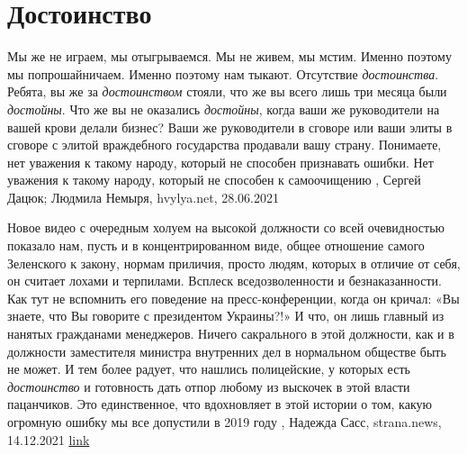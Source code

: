  
 
 
 
 
\chapter{Достоинство}
\label{sec:slova.dostoinstvo}

Мы же не играем, мы отыгрываемся. Мы не живем, мы мстим. Именно поэтому мы
попрошайничаем. Именно поэтому нам тыкают. Отсутствие \emph{достоинства}. Ребята, вы
же за \emph{достоинством} стояли, что же вы всего лишь три месяца были \emph{достойны}. Что
же вы не оказались \emph{достойны}, когда ваши же руководители на вашей крови делали
бизнес? Ваши же руководители в сговоре или ваши элиты в сговоре с элитой
враждебного государства продавали вашу страну. Понимаете, нет уважения к такому
народу, который не способен признавать ошибки. Нет уважения к такому народу,
который не способен к самоочищению
, 
Сергей Дацюк; Людмила Немыря, hvylya.net, 28.06.2021

Новое видео с очередным холуем на высокой должности со всей очевидностью
показало нам, пусть и в концентрированном виде, общее отношение самого
Зеленского к закону, нормам приличия, просто людям, которых в отличие от себя,
он считает лохами и терпилами. Всплеск вседозволенности и безнаказанности.  Как
тут не вспомнить его поведение на пресс-конференции, когда он кричал: «Вы
знаете, что Вы говорите с президентом Украины?!» И что, он лишь главный из
нанятых гражданами менеджеров. Ничего сакрального в этой должности, как и в
должности заместителя министра внутренних дел в нормальном обществе быть не
может.  И тем более радует, что нашлись полицейские, у которых есть
\emph{достоинство} и готовность дать отпор любому из выскочек в этой власти
пацанчиков. Это единственное, что вдохновляет в этой истории о том, какую
огромную ошибку мы все допустили в 2019 году
, 
Надежда Сасс, strana.news, 14.12.2021
\href{https://strana.news/opinions/367088-epokha-zelenskoho-eto-vsplesk-vsedozvolennosti-i-beznakazannosti.html}{link}
